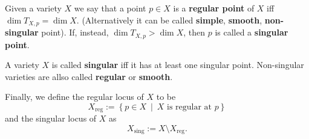 \begin{defn}
	Given a variety $X$ we say that a point $p \in X$ is a \textbf{regular point} of $X$
	iff $\dim T_{X,p} = \dim X$.
	(Alternatively it can be called \textbf{simple}, \textbf{smooth}, \textbf{non-singular} point).
	If, instead, $\dim T_{X,p} > \dim X$, then $p$ is called a \textbf{singular point}.

	A variety $X$ is called \textbf{singular} iff it has at least one singular point.
	Non-singular varieties are allso called \textbf{regular} or \textbf{smooth}.
	
	Finally, we define the regular locus of $X$ to be
	\begin{equation}
	X_{\text{reg}} := \left\{ p \in X \ \middle|\ X \text{ is regular at } p \right\}
	\end{equation} 
	and the singular locus of $X$ as
	\begin{equation}
	X_{\text{sing}} := X \setminus X_{\text{reg}}
	.\end{equation} 
\end{defn}

